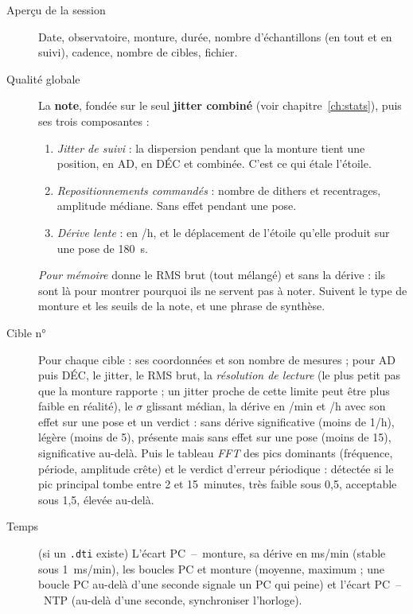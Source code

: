 \begin{description}
  \item[Aperçu de la session] Date, observatoire, monture, durée, nombre
  d'échantillons (en tout et en suivi), cadence, nombre de cibles, fichier.

  \item[Qualité globale] La \textbf{note}, fondée sur le seul \textbf{jitter
  combiné} (voir chapitre~\ref{ch:stats}), puis ses trois composantes :
  \begin{enumerate}
    \item \emph{Jitter de suivi} : la dispersion pendant que la monture tient
    une position, en AD, en DÉC et combinée. C'est ce qui étale l'étoile.
    \item \emph{Repositionnements commandés} : nombre de dithers et recentrages,
    amplitude médiane. Sans effet pendant une pose.
    \item \emph{Dérive lente} : en \arcsec/h, et le déplacement de l'étoile
    qu'elle produit sur une pose de 180~s.
  \end{enumerate}
  \emph{Pour mémoire} donne le RMS brut (tout mélangé) et sans la dérive : ils
  sont là pour montrer pourquoi ils ne servent pas à noter. Suivent le type de
  monture et les seuils de la note, et une phrase de synthèse.

  \item[Cible n°] Pour chaque cible : ses coordonnées et son nombre de mesures ;
  pour AD puis DÉC, le jitter, le RMS brut, la \emph{résolution de lecture} (le
  plus petit pas que la monture rapporte ; un jitter proche de cette limite peut
  être plus faible en réalité), le $\sigma$ glissant médian, la dérive en \arcsec/min
  et \arcsec/h avec son effet sur une pose et un verdict : sans dérive
  significative (moins de 1\arcsec/h), légère (moins de 5), présente mais sans
  effet sur une pose (moins de 15), significative au-delà. Puis le tableau
  \emph{FFT} des pics dominants (fréquence, période, amplitude crête) et le
  verdict d'erreur périodique : détectée si le pic principal tombe entre 2 et
  15~minutes, très faible sous 0,5\arcsec, acceptable sous 1,5\arcsec, élevée
  au-delà.

  \item[Temps] (si un \texttt{.dti} existe) L'écart PC~--~monture, sa dérive
  en ms/min (stable sous 1~ms/min), les boucles PC et monture (moyenne,
  maximum ; une boucle PC au-delà d'une seconde signale un PC qui peine) et
  l'écart PC~--~NTP (au-delà d'une seconde, synchroniser l'horloge).


\end{description}
